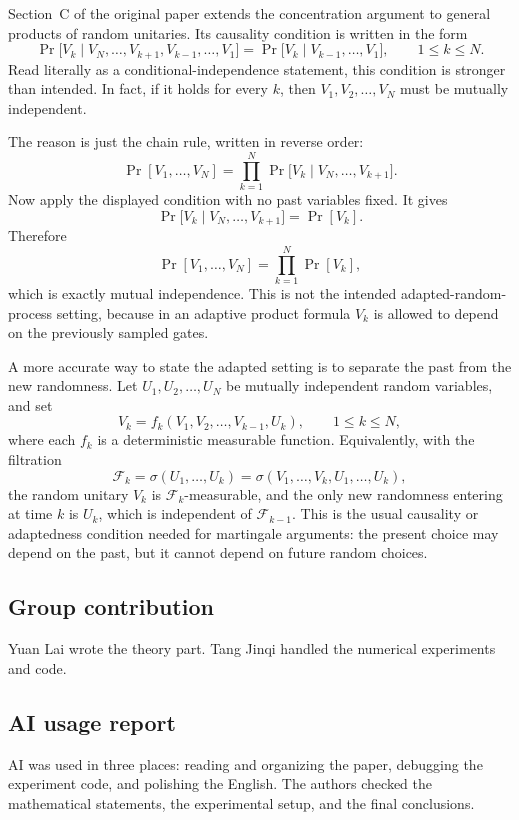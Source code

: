 ﻿\documentclass[12pt]{article}
\theoremstyle{plain}
\theoremstyle{definition}
\begin{document}
	Section~C of the original paper extends the concentration argument to general products of random unitaries. Its causality condition is written in the form
	\[
	\Pr\!\bigl[V_k\mid V_N,\ldots,V_{k+1},V_{k-1},\ldots,V_1\bigr]
	=\Pr\!\bigl[V_k\mid V_{k-1},\ldots,V_1\bigr],
	\qquad 1\le k\le N.
	\]
	Read literally as a conditional-independence statement, this condition is stronger than intended. In fact, if it holds for every $k$, then $V_1,V_2,\ldots,V_N$ must be mutually independent.

	The reason is just the chain rule, written in reverse order:
	\[
	\Pr[V_1,\ldots,V_N]
	=\prod_{k=1}^N \Pr\!\bigl[V_k\mid V_N,\ldots,V_{k+1}\bigr].
	\]
	Now apply the displayed condition with no past variables fixed. It gives
	\[
	\Pr\!\bigl[V_k\mid V_N,\ldots,V_{k+1}\bigr]=\Pr[V_k].
	\]
	Therefore
	\[
	\Pr[V_1,\ldots,V_N]=\prod_{k=1}^N \Pr[V_k],
	\]
	which is exactly mutual independence. This is not the intended adapted-random-process setting, because in an adaptive product formula $V_k$ is allowed to depend on the previously sampled gates.

	A more accurate way to state the adapted setting is to separate the past from the new randomness. Let $U_1,U_2,\ldots,U_N$ be mutually independent random variables, and set
	\[
	V_k=f_k(V_1,V_2,\ldots,V_{k-1},U_k),
	\qquad 1\le k\le N,
	\]
	where each $f_k$ is a deterministic measurable function. Equivalently, with the filtration
	\[
	\mathcal F_k=\sigma(U_1,\ldots,U_k)=\sigma(V_1,\ldots,V_k,U_1,\ldots,U_k),
	\]
	the random unitary $V_k$ is $\mathcal F_k$-measurable, and the only new randomness entering at time $k$ is $U_k$, which is independent of $\mathcal F_{k-1}$. This is the usual causality or adaptedness condition needed for martingale arguments: the present choice may depend on the past, but it cannot depend on future random choices.

	\subsection{Group contribution}

	Yuan Lai wrote the theory part. Tang Jinqi handled the numerical experiments and code.

	\subsection{AI usage report}

	AI was used in three places: reading and organizing the paper, debugging the experiment code, and polishing the English. The authors checked the mathematical statements, the experimental setup, and the final conclusions.
\end{document}
